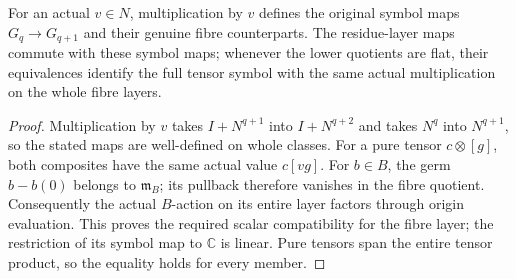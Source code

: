 \begin{theorem}
\label{hir:actual-principal-parts-residue-symbol-square}
\leanok
{}
For an actual $v\in N$, multiplication by $v$ defines the original
symbol maps $G_q\to G_{q+1}$ and their genuine fibre counterparts.
The residue-layer maps commute with these symbol maps; whenever the
lower quotients are flat, their equivalences identify the full tensor
symbol with the same actual multiplication on the whole fibre layers.
\end{theorem}
\begin{proof}
Multiplication by $v$ takes $I+N^{q+1}$ into $I+N^{q+2}$ and takes
$N^q$ into $N^{q+1}$, so the stated maps are well-defined on whole
classes. For a pure tensor $c\otimes[g]$, both composites have the
same actual value $c[vg]$. For $b\in B$, the germ $b-b(0)$ belongs
to $\mathfrak m_B$; its pullback therefore vanishes in the fibre quotient.
Consequently the actual $B$-action on its entire layer factors through
origin evaluation.
This proves the required scalar compatibility for the fibre layer; the
restriction of its symbol map to $\mathbb C$ is linear. Pure tensors
span the entire tensor product, so the equality holds for every member.
\end{proof}

